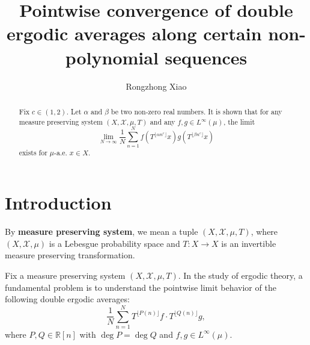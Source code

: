 \documentclass[reqno,12pt]{amsart}
\def \R {\mathbb R}
\def \X {\mathcal{X}}
\numberwithin{equation}{section}
\begin{document}
\hypersetup{linkcolor=red}
	
\title[]{Pointwise convergence of double ergodic averages along certain non-polynomial sequences}

	\author[]{Rongzhong Xiao}		
	\address[Rongzhong Xiao]{School of Mathematical Sciences, 
		University of Science and Technology of China, 
		Hefei, Anhui, 230026, PR China}
	

\begin{abstract}
	Fix $c\in (1,2)$. Let $\alpha$ and $\beta$ be two non-zero real numbers. It is shown that for any measure preserving system $(X,\X,\mu,T)$ and any $f,g\in L^{\infty}(\mu)$, the limit
	\begin{equation*}
	\lim_{N\to\infty}\frac{1}{N}\sum_{n=1}^{N}f(T^{\lfloor \alpha n^c \rfloor}x)g(T^{\lfloor \beta n^c \rfloor}x)
	\end{equation*}
	exists for $\mu$-a.e. $x\in X$.
\end{abstract}

\maketitle 
\section{Introduction}
By {\bf measure preserving system}, we mean a tuple $(X,\X,\mu,T)$, where $(X,\X,\mu)$ is a Lebesgue probability space and $T:X\to X$ is an invertible measure preserving transformation. 

Fix a measure preserving system $(X,\X,\mu,T)$. In the study of ergodic theory, a fundamental problem is to understand the pointwise limit behavior of the following double ergodic averages:
\begin{equation}\label{eq1-0}
	\frac{1}{N}\sum_{n=1}^{N}T^{\lfloor P(n)\rfloor}f\cdot T^{\lfloor Q(n)\rfloor}g,
\end{equation}
where $P,Q\in \R[n]$ with $\deg P=\deg Q$ and $f,g\in L^{\infty}(\mu)$.
\end{document}
